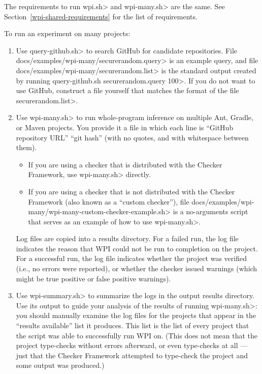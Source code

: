 The requirements to run \<wpi.sh> and \<wpi-many.sh> are the same. See Section~\ref{wpi-shared-requirements}
for the list of requirements.

To run an experiment on many projects:
\begin{enumerate}
\item Use \<query-github.sh> to search GitHub for candidate repositories.
File \<docs/examples/wpi-many/securerandom.query> is an example query, and file
\<docs/examples/wpi-many/securerandom.list> is the standard output
created by running \<query-github.sh securerandom.query 100>. If you do
not want to use GitHub, construct a file yourself that matches the format of
the file \<securerandom.list>.

\item Use \<wpi-many.sh> to run whole-program inference on multiple
Ant, Gradle, or Maven projects.  You provide it a file in which each line
is ``GitHub repository URL'' ``git hash'' (with no quotes, and with
whitespace between them).
\begin{itemize}
\item If you are using a checker that is distributed with the Checker
Framework, use \<wpi-many.sh> directly.
\item If you are using a checker that is not distributed with the Checker
Framework (also known as a ``custom checker''), file
\<docs/examples/wpi-many/wpi-many-custom-checker-example.sh> is a no-arguments
script that serves as an example of how to use \<wpi-many.sh>.
\end{itemize}

Log files are copied into a results directory.
For a failed run, the log file indicates the reason that WPI could not
be run to completion on the project.
For a successful run, the log file indicates whether the project was verified
(i.e., no errors were reported), or whether the checker issued warnings
(which might be true positive or false positive warnings).

\item Use \<wpi-summary.sh> to summarize the logs in the output results directory.
Use its output to guide your analysis of the results of running \<wpi-many.sh>:
you should manually examine the log files for the projects that appear in the
``results available'' list it produces. This list is the list of every project
that the script was able to successfully run WPI on.  (This does not mean
that the project type-checks without errors afterward, or even type-checks at
all --- just that the Checker Framework attempted to type-check the project and
some output was produced.)


\end{enumerate}
